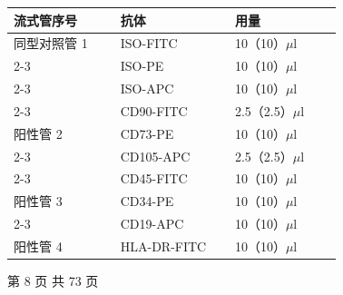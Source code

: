 \documentclass[UTF8,10pt,a4paper,fontset=fandol]{ctexart}
\newcommand{\fieldvalue}[1]{#1}
\newcommand{\handwritten}[1]{#1}
\begin{document}
\vspace{4pt}

\begin{center}
\begin{tabular}{|p{0.28\linewidth}|p{0.30\linewidth}|p{0.28\linewidth}|}
\hline
流式管序号 & 抗体 & 用量 \\ \hline
同型对照管 1 & ISO-FITC &
\fieldvalue{\handwritten{10}}（10）$\mu$l
\\ \cline{2-3}
& ISO-PE &
\fieldvalue{\handwritten{10}}（10）$\mu$l
\\ \cline{2-3}
& ISO-APC &
\fieldvalue{\handwritten{10}}（10）$\mu$l
\\ \cline{2-3}
& CD90-FITC &
\fieldvalue{\handwritten{2.5}}（2.5）$\mu$l
\\ \hline
阳性管 2 & CD73-PE &
\fieldvalue{\handwritten{10}}（10）$\mu$l
\\ \cline{2-3}
& CD105-APC &
\fieldvalue{\handwritten{2.5}}（2.5）$\mu$l
\\ \cline{2-3}
& CD45-FITC &
\fieldvalue{\handwritten{10}}（10）$\mu$l
\\ \hline
阳性管 3 & CD34-PE &
\fieldvalue{\handwritten{10}}（10）$\mu$l
\\ \cline{2-3}
& CD19-APC &
\fieldvalue{\handwritten{10}}（10）$\mu$l
\\ \hline
阳性管 4 & HLA-DR-FITC &
\fieldvalue{\handwritten{10}}（10）$\mu$l
\\ \hline
\end{tabular}
\end{center}

\begin{center}
第 8 页 共 73 页
\end{center}

\newpage
\end{document}
